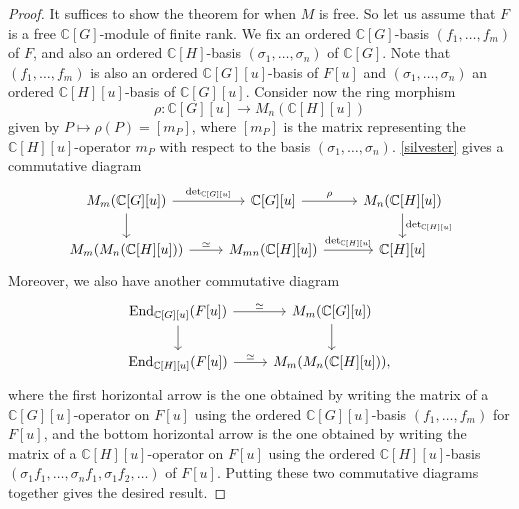 \documentclass[11pt]{amsart}
\numberwithin{equation}{section}
\theoremstyle{remark}
\theoremstyle{definition}
\begin{document}
\begin{proof}
It suffices to show the theorem for when $M$ is free.  So let us assume that $F$ is a free $\mathbb{C}[G]$-module of finite rank.  We fix an ordered $\mathbb{C}[G]$-basis $(f_{1},\ldots,f_{m})$ of $F$, and also an ordered $\mathbb{C}[H]$-basis $(\sigma_{1},\ldots,\sigma_{n})$ of $\mathbb{C}[G]$.  Note that $(f_{1},\ldots,f_{m})$ is also an ordered $\mathbb{C}[G][u]$-basis of $F[u]$ and $(\sigma_{1},\ldots,\sigma_{n})$ an ordered $\mathbb{C}[H][u]$-basis of $\mathbb{C}[G][u]$.  Consider now the ring morphism
$$\rho: \mathbb{C}[G][u] \rightarrow M_{n}(\mathbb{C}[H][u]) $$
given by $P \mapsto \rho(P) = [m_{P}]$, where $[m_{P}]$ is the matrix representing the $\mathbb{C}[H][u]$-operator $m_{P}$ with respect to the basis $(\sigma_{1},\ldots,\sigma_{n})$.  \cref{silvester} gives a commutative diagram
\begin{equation*}
\begin{tikzcd}
M_{m}(\mathbb{C}[G][u]) \arrow[,d] \arrow["{\rm det}_{\mathbb{C}[G][u]}",r] & \mathbb{C}[G][u]  \arrow["\rho",r] & M_{n}(\mathbb{C}[H][u]) \arrow["{\rm det}_{\mathbb{C}[H][u]}",d]\\
M_{m}(M_{n}(\mathbb{C}[H][u]))  \arrow["\simeq",r] & M_{mn}(\mathbb{C}[H][u]) \arrow["{\rm det}_{\mathbb{C}[H][u]}",r] & \mathbb{C}[H][u]
\end{tikzcd}
\end{equation*}
Moreover, we also have another commutative diagram
\begin{equation*}
\begin{tikzcd}
{\rm End}_{\mathbb{C}[G][u]}(F[u]) \arrow["\simeq",r] \arrow[,d] & M_{m}(\mathbb{C}[G][u]) \arrow[,d]  \\
{\rm End}_{\mathbb{C}[H][u]}(F[u]) \arrow["\simeq",r] & M_{m}(M_{n}(\mathbb{C}[H][u])),
\end{tikzcd}
\end{equation*}
where the first horizontal arrow is the one obtained by writing the matrix of a $\mathbb{C}[G][u]$-operator on $F[u]$ using the ordered $\mathbb{C}[G][u]$-basis $(f_{1},\ldots,f_{m})$ for $F[u]$, and the bottom horizontal arrow is the one obtained by writing the matrix of a $\mathbb{C}[H][u]$-operator on $F[u]$ using the ordered $\mathbb{C}[H][u]$-basis $(\sigma_{1}f_{1},\ldots,\sigma_{n}f_{1},\sigma_{1}f_{2},\ldots)$ of $F[u]$.  Putting these two commutative diagrams together gives the desired result.
\end{proof}
\end{document}
